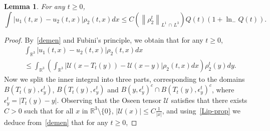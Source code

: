 \documentclass[10pt]{amsart}
\newtheorem{lemm}[theo]{Lemma}\newtheorem{prop}[theo]{Proposition}\newtheorem{coro}[theo]{Corollary}\newtheorem{conj}[theo]{Conjecture}
\theoremstyle{definition}\newtheorem{defi}[theo]{Definition}\newtheorem{rema}[theo]{Remark}\newtheorem{exam}[theo]{Example}\newtheorem{exem}[theo]{Example}\newtheorem{nota}[theo]{Notation}
\newcommand{\R}{\mathbb{R}}
\newcommand{\clU}{\mathcal{U}}
\renewcommand{\leq}{\leqslant}
\renewcommand{\geq}{\geqslant}
\begin{document}
\begin{lemm}\label{LLint}
For any $t\geq 0$,
\begin{equation}\label{esti-LLint}
\int\big|u_1(t,x)-u_2(t,x)\big|\rho_2(t,x)dx \leq C\left(\left\|\rho_2^t\right\|_{L^1\,\cap\,L^3}\right) Q(t) (1+\ln_{-} Q(t)).
\end{equation}
\end{lemm}
\begin{proof}
By~\eqref{demen} and Fubini's principle, we obtain that for any $t\geq 0$,
\begin{multline*}
\int_{\R^3}|u_1(t,x)-u_2(t,x)|\rho_2(t,x)dx \\ \leq \int_{\R^3}\left(\int_{\R^3} |\clU(x-T_t (y))-\clU(x-y)| \rho_2(t,x) dx \right) \rho_2^t(y) dy.
\end{multline*}
Now we split the inner integral into three parts, corresponding to the domains $B(T_t (y),\epsilon_y^t)$, $B(T_t (y),\epsilon_y^t)$ and $B(y,\epsilon_y^t)^c \cap B(T_t (y),\epsilon_y^t)^c$, where $\epsilon_y^t =|T_t (y) - y|$. Observing that the Oseen tensor $\clU$ satisfies that there exists $C>0$ such that for all $x $ in $\R^3 \setminus \{ 0\}$, $ \left|\clU(x) \right|\leq C\frac{1}{|x|} $, and using~\eqref{Lip-prop} we deduce from~\eqref{demen} that for any $t\geq 0$,


\end{proof}
\end{document}
